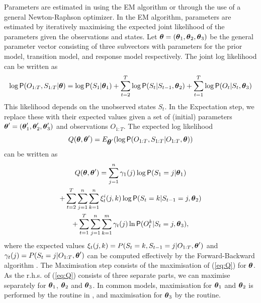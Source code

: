 \documentclass[article]{jss}
\newcommand{\greekv}[1]{\mbox{\boldmath$\mathrm{#1}$}}
\begin{document}
Parameters are estimated in  using the EM algorithm or
through the use of a general Newton-Raphson optimizer.  In the EM algorithm, 
parameters are estimated by iteratively maximising the 
expected joint likelihood of the parameters given the observations and states. 
Let $\greekv{\theta} = (\greekv{\theta}_1, \greekv{\theta}_2,\greekv{\theta}_3)$
be the general parameter vector consisting of three subvectors with parameters 
for the prior model, transition model, and response model respectively. The 
joint log likelihood can be written as
\begin{equation}
\log \Prob(O_{1:T}, S_{1:T}|\greekv{\theta}) = \log \Prob(S_1|\greekv{\theta}_1) 
+ \sum_{t=2}^{T} \log \Prob(S_t|S_{t-1},\greekv{\theta}_2) 
+ \sum_{t=1}^{T} \log \Prob(O_t|S_t,\greekv{\theta}_3)
\end{equation}
This likelihood depends on the unobserved states $S_t$. In the Expectation step,
we replace these with their expected values given a set of (initial) parameters 
$\greekv{\theta}' = (\greekv{\theta}'_1, \greekv{\theta}'_2,\greekv{\theta}'_3)$
and observations $O_{1:T}$. The expected log likelihood 
\begin{equation}
Q(\greekv{\theta},\greekv{\theta}') = E_{\greekv{\theta}'} 
(\log \Prob(O_{1:T},S_{1:T}|O_{1:T},\greekv{\theta}))
\end{equation}
can be written as
\begin{multline}
\label{eq:Q}
Q(\greekv{\theta},\greekv{\theta}') = 
\sum_{j=1}^n \gamma_1(j) \log \Prob(S_1=j|\greekv{\theta}_1) \\ 
+ \sum_{t=2}^T \sum_{j=1}^n \sum_{k=1}^n \xi_t^i(j,k) \log \Prob(S_t = k|S_{t-1} 
= j,\greekv{\theta}_2)  \\
 + \sum_{t=1}^T \sum_{j=1}^n \sum_{k=1}^m \gamma_t(j) 
\ln \Prob(O^k_t|S_t=j,\greekv{\theta}_3),
\end{multline}
where the expected values $\xi_t(j,k) =  P(S_t = k, S_{t-1} = j|O_{1:T},\greekv{\theta}')$ and $\gamma_t(j) = P(S_t = j|O_{1:T},\greekv{\theta}')$ can be computed effectively by the Forward-Backward algorithm \citep[see e.g.,][]{Rabiner1989}. The Maximisation step consists of the maximisation of (\ref{eq:Q}) for $\greekv{\theta}$. As the r.h.s. of (\ref{eq:Q}) consists of three separate parts, we can maximise separately for $\greekv{\theta}_1$, $\greekv{\theta}_2$ and $\greekv{\theta}_3$. In common models, maximisation for $\greekv{\theta}_1$ and $\greekv{\theta}_2$ is performed by the  routine in , and maximisation for $\greekv{\theta}_3$ by the  routine. 
\end{document}
